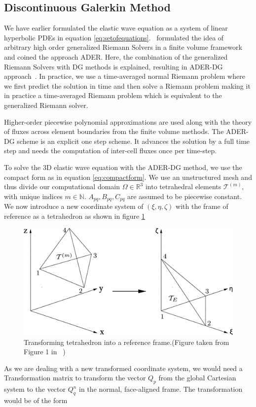 \subsection[Discontinuous Galerkin method]{Discontinuous Galerkin Method}\label{subsection:DG}
We have earlier formulated the elastic wave equation as a system of linear hyperbolic \ac{PDE}s in equation \ref{eq:setofequations}.~
\parencite{Toro2001} formulated the idea of arbitrary high order generalized
Riemann Solvers in a finite volume framework and coined the approach \ac{ADER}. Here, the combination of the generalized Riemann Solvers with \ac{DG}
methods is explained, resulting in \ac{ADER}-\ac{DG} approach~\parencite{Dumbser2006}. In practice, we use a time-averaged normal Riemann problem where we first predict
the solution in time and then solve a Riemann problem making it in practice a time-averaged Riemann problem which is equivalent to the generalized Riemann solver.
\par Higher-order piecewise polynomial approximations are used
along with the theory of fluxes across element boundaries from the finite volume methods. The \ac{ADER}-\ac{DG} scheme is an explicit one step scheme.
It advances the solution by a full time step and needs the computation of inter-cell fluxes once per time-step.

To solve the 3D elastic wave equation with the \ac{ADER}-\ac{DG} method, we use the compact form as in equation \ref{eq:compactform}.
We use an unstructured mesh and thus divide our computational domain $\Omega \in \mathbb{R}^3$ into tetrahedral elements 
$\mathcal{T}^{\left(m\right)}$, with unique indices $m\in\mathbb{N}$. $A_{pq}, B_{pq}, C_{pq}$ are assumed to be piecewise constant. 
We now introduce a new coordinate system of $\left(\xi, \eta, \zeta \right)$ with the frame of reference as a tetrahedron as shown 
in figure \ref{fig:transformation} \\

\begin{figure}[!htpb]
    \centering
    \includegraphics[width=0.6\linewidth]{figures/m_167-1-319-fig001.png}
    \caption{Transforming tetrahedron into a reference frame.(Figure taken from Figure 1 in ~\parencite{dumbser1})}
    \label{fig:transformation}
\end{figure}
As we are dealing with a new transformed coordinate system, we would need a Transformation matrix to transform the vector $Q_p$
from the global Cartesian system to the vector $Q_q^n$ in the normal, face-aligned frame. The transformation would be of the form

